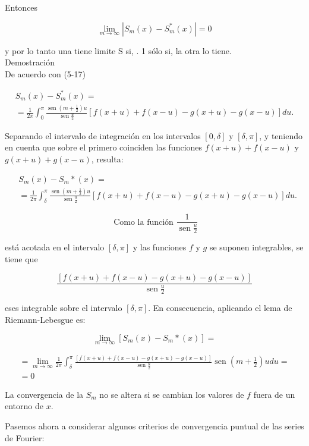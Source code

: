 \documentclass[10pt]{article}
\theoremstyle{plain}
\theoremstyle{definition}
\theoremstyle{remark}
\begin{document}
Entonces

$$
\lim _{m \rightarrow \infty}\left|S_{m}(x)-S_{m}^{*}(x)\right|=0
$$

y por lo tanto una tiene limite S si, . 1 sólo si, la otra lo tiene.\\
Demostración\\
De acuerdo con (5-17)

$$
\begin{gathered}
S_{m}(x)-S_{m}^{*}(x)= \\
=\frac{1}{2 \pi} \int_{0}^{\pi} \frac{\operatorname{sen}\left(m+\frac{1}{2}\right) u}{\operatorname{sen} \frac{u}{2}}[f(x+u)+f(x-u)-g(x+u)-g(x-u)] d u .
\end{gathered}
$$

Separando el intervalo de integración en los intervalos $[0, \delta]$ y $[\delta, \pi]$, y teniendo en cuenta que sobre el primero coinciden las funciones $f(x+u)+f(x-u)$ y $g(x+u)+g(x-u)$, resulta:

$$
\begin{aligned}
& S_{m}(x)-S_{m} *(x)= \\
& =\frac{1}{2 \pi} \int_{\delta}^{\pi} \frac{\operatorname{sen}\left(m+\frac{1}{2}\right) u}{\operatorname{sen} \frac{u}{2}}[f(x+u)+f(x-u)-g(x+u)-g(x-u)] d u .
\end{aligned}
$$

$$
\text { Como la función } \frac{1}{\operatorname{sen} \frac{u}{2}}
$$

está acotada en el intervalo $[\delta, \pi]$ y las funciones $f$ y $g$ se suponen integrables, se tiene que

$$
\frac{[f(x+u)+f(x-u)-g(x+u)-g(x-u)]}{\operatorname{sen} \frac{u}{2}}
$$

eses integrable sobre el intervalo $[\delta, \pi]$. En consecuencia, aplicando el lema de Riemann-Lebesgue es:

$$
\lim _{m \rightarrow \infty}\left[S_{m}(x)-S_{m} *(x)\right]=
$$

$$
\begin{gathered}
=\lim _{m \rightarrow \infty} \frac{1}{2 \pi} \int_{\delta}^{\pi} \frac{[f(x+u)+f(x-u)-g(x+u)-g(x-u)]}{\operatorname{sen} \frac{u}{2}} \operatorname{sen}\left(m+\frac{1}{2}\right) u d u= \\
=0
\end{gathered}
$$

La convergencia de la $S_{m}$ no se altera si se cambian los valores de $f$ fuera de un entorno de $x$.

Pasemos ahora a considerar algunos criterios de convergencia puntual de las series de Fourier:
\end{document}
